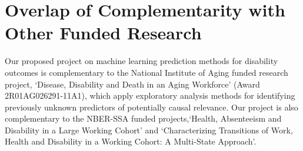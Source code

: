 \documentclass[letter]{article}
\begin{document}
\section{Overlap of Complementarity with Other Funded Research}
Our proposed project on machine learning prediction methods for disability outcomes is complementary to the National Institute of Aging funded research project, `Disease, Disability and Death in an Aging Workforce' (Award 2R01AG026291-11A1), which apply exploratory analysis methods for identifying previously unknown predictors of potentially causal relevance.  Our project is also complementary to the NBER-SSA funded projects,`Health, Absenteeism and Disability in a Large Working Cohort' and `Characterizing Transitions of Work, Health and Disability in a Working Cohort: A Multi-State Approach'.


\end{document}
